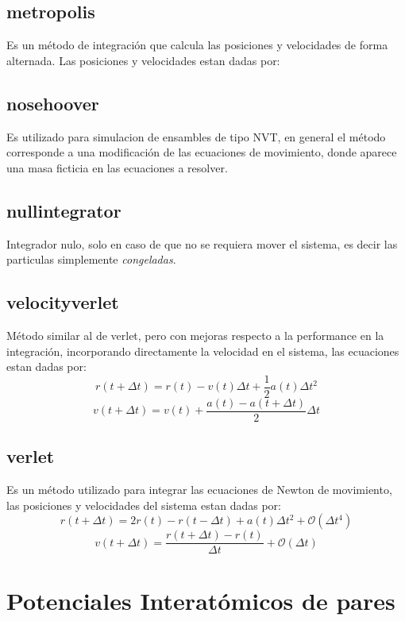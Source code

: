 \subsection{metropolis}
Es un m\'etodo de integraci\'on que calcula las posiciones y velocidades de forma alternada. Las posiciones y velocidades estan dadas por:

\subsection{nosehoover}
Es utilizado para simulacion de ensambles de tipo NVT, en general el m\'etodo corresponde a una modificaci\'on de las ecuaciones de movimiento, donde aparece una masa ficticia en las ecuaciones a resolver.

\subsection{nullintegrator}
Integrador nulo, solo en caso de que no se requiera mover el sistema, es decir las particulas simplemente \textit{congeladas}.

\subsection{velocityverlet}
M\'etodo similar al de verlet, pero con mejoras respecto a la performance en la integraci\'on, incorporando directamente la velocidad en el sistema, las ecuaciones estan dadas por:
$$r(t+\Delta t) = r(t) - v(t)\Delta t + \frac{1}{2}a(t)\Delta t^2$$
$$v(t+\Delta t) = v(t) + \frac{a(t) - a(t + \Delta t)}{2}\Delta t$$

\subsection{verlet}
Es un m\'etodo utilizado para integrar las ecuaciones de Newton de movimiento, las posiciones y velocidades del sistema estan dadas por:
$$r(t+\Delta t) = 2r(t) - r(t-\Delta t) + a(t)\Delta t^2 + \mathcal{O}(\Delta t^4)$$
$$v(t+\Delta t) = \frac{r(t+\Delta t) - r(t)}{\Delta t} + \mathcal{O}(\Delta t)$$



\section{Potenciales Interat\'omicos de pares}

